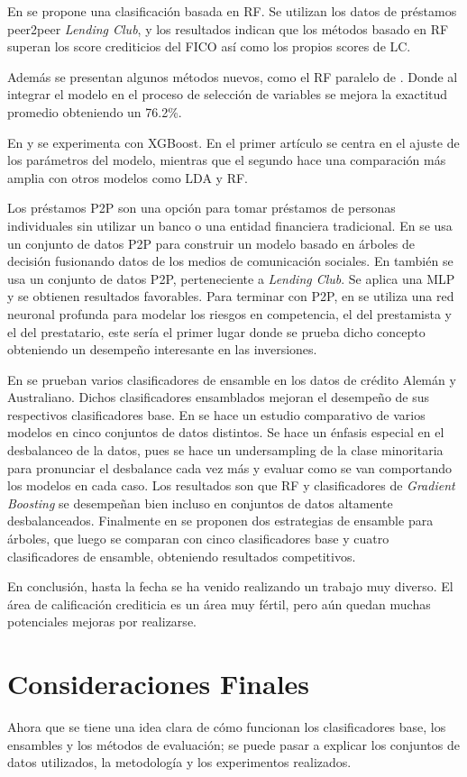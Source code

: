 En \citep{malekipirbazari2015risk} se propone una clasificación basada en \ac{RF}. Se utilizan los datos de préstamos peer2peer \textit{Lending Club}, y los resultados indican que los métodos basado en \ac{RF} superan los score crediticios del FICO así como los propios scores de LC.

Además se presentan algunos métodos nuevos, como el \ac{RF} paralelo de \citep{van2016novel}. Donde al integrar el modelo en el proceso de selección de variables se mejora la exactitud promedio obteniendo un 76.2\%.

En \citep{xia2017boosted} y \citep{bhatia2017credit} se experimenta con \ac{XGBoost}. En el primer artículo se centra en el ajuste de los parámetros del modelo, mientras que el segundo hace una comparación más amplia con otros modelos como \ac{LDA} y \ac{RF}.

Los préstamos \ac{P2P} son una opción para tomar préstamos de personas individuales sin utilizar un banco o una entidad financiera tradicional. En \citep{zhang2016research} se usa un conjunto de datos \ac{P2P} para construir un modelo basado en árboles de decisión fusionando datos de los medios de comunicación sociales. En \citep{zang2014credit} también se usa un conjunto de datos \ac{P2P}, perteneciente a \textit{Lending Club}. Se aplica una \ac{MLP} y se obtienen resultados favorables. Para terminar con \ac{P2P}, en \citep{tan2018deep} se utiliza una red neuronal profunda para modelar los riesgos en competencia, el del prestamista y el del prestatario, este sería el primer lugar donde se prueba dicho concepto obteniendo un desempeño interesante en las inversiones.

En \citep{nanni2009experimental} se prueban varios clasificadores de ensamble en los datos de crédito Alemán y Australiano. Dichos clasificadores ensamblados mejoran el desempeño de sus respectivos clasificadores base. En \citep{brown2012experimental} se hace un estudio comparativo de varios modelos en cinco conjuntos de datos distintos. Se hace un énfasis especial en el desbalanceo de la datos, pues se hace un undersampling de la clase minoritaria para pronunciar el desbalance cada vez más y evaluar como se van comportando los modelos en cada caso. Los resultados son que \ac{RF} y clasificadores de \textit{Gradient Boosting} se desempeñan bien incluso en conjuntos de datos altamente desbalanceados. Finalmente en \citep{wang2012two} se proponen dos estrategias de ensamble para árboles, que luego se comparan con cinco clasificadores base y cuatro clasificadores de ensamble, obteniendo resultados competitivos.

En conclusión, hasta la fecha se ha venido realizando un trabajo muy diverso. El área de calificación crediticia es un área muy fértil, pero aún quedan muchas potenciales mejoras por realizarse.

\section{Consideraciones Finales}

Ahora que se tiene una idea clara de cómo funcionan los clasificadores base, los ensambles y los métodos de evaluación; se puede pasar a explicar los conjuntos de datos utilizados, la metodología y los experimentos realizados.
